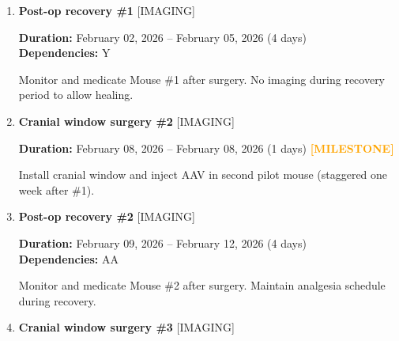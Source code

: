 \documentclass[landscape,a4paper]{article}
\begin{document}
\begin{enumerate}[leftmargin=1.5cm, itemsep=1em, parsep=0.5em]
    \item \textcolor{other}{\textbf{\large Post-op recovery \#1}}
          \hfill \textcolor{black!60}{\small [IMAGING]}
          
          \vspace{0.2em}
          \textcolor{black!70}{\textbf{Duration:} February 02, 2026 -- February 05, 2026 (4 days)}
          \\[0.2em]\textcolor{black!70}{\textbf{Dependencies:} Y}\n
          \vspace{0.4em}
          \begin{minipage}[t]{0.9\textwidth}
          \textcolor{black!85}{Monitor and medicate Mouse \#1 after surgery. No imaging during recovery period to allow healing.}
          \end{minipage}

    \item \textcolor{other}{\textbf{\large Cranial window surgery \#2}}
          \hfill \textcolor{black!60}{\small [IMAGING]}
          
          \vspace{0.2em}
          \textcolor{black!70}{\textbf{Duration:} February 08, 2026 -- February 08, 2026 (1 days)}
          \textcolor{orange}{\textbf{ [MILESTONE]}}\n
          \vspace{0.4em}
          \begin{minipage}[t]{0.9\textwidth}
          \textcolor{black!85}{Install cranial window and inject AAV in second pilot mouse (staggered one week after \#1).}
          \end{minipage}

    \item \textcolor{other}{\textbf{\large Post-op recovery \#2}}
          \hfill \textcolor{black!60}{\small [IMAGING]}
          
          \vspace{0.2em}
          \textcolor{black!70}{\textbf{Duration:} February 09, 2026 -- February 12, 2026 (4 days)}
          \\[0.2em]\textcolor{black!70}{\textbf{Dependencies:} AA}\n
          \vspace{0.4em}
          \begin{minipage}[t]{0.9\textwidth}
          \textcolor{black!85}{Monitor and medicate Mouse \#2 after surgery. Maintain analgesia schedule during recovery.}
          \end{minipage}

    \item \textcolor{other}{\textbf{\large Cranial window surgery \#3}}
          \hfill \textcolor{black!60}{\small [IMAGING]}
          

\end{enumerate}
\end{document}
